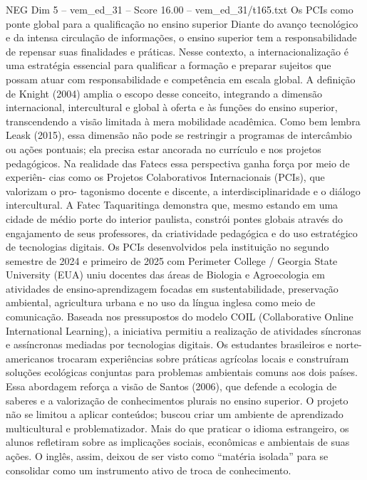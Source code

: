 \begin{textsample}{NEG Dim 5 – vem\_ed\_31 – Score 16.00 – vem\_ed\_31/t165.txt}  \label{ex:f5_neg_125}
Os PCIs como ponte global para a qualificação no ensino superior Diante do avanço tecnológico e da intensa circulação de informações, o ensino superior tem a responsabilidade de repensar suas finalidades e práticas.
Nesse contexto, a internacionalização é uma estratégia essencial para qualificar a formação e preparar sujeitos que possam atuar com responsabilidade e competência em escala global.
A definição de Knight (2004) amplia o escopo desse conceito, integrando a dimensão internacional, intercultural e global à oferta e às funções do ensino superior, transcendendo a visão limitada à mera mobilidade acadêmica.
Como bem lembra Leask (2015), essa dimensão não pode se restringir a programas de intercâmbio ou ações pontuais; ela precisa estar ancorada no currículo e nos projetos pedagógicos.
Na realidade das Fatecs essa perspectiva ganha força por meio de experiên- cias como os Projetos Colaborativos Internacionais (PCIs), que valorizam o pro- tagonismo docente e discente, a interdisciplinaridade e o diálogo intercultural.
A Fatec Taquaritinga demonstra que, mesmo estando em uma cidade de médio porte do interior paulista, constrói pontes globais através do engajamento de seus professores, da criatividade pedagógica e do uso estratégico de tecnologias digitais.
Os PCIs desenvolvidos pela instituição no segundo semestre de 2024 e primeiro de 2025 com Perimeter College / Georgia State University (EUA) uniu docentes das áreas de Biologia e Agroecologia em atividades de ensino-aprendizagem focadas em sustentabilidade, preservação ambiental, agricultura urbana e no uso da língua inglesa como meio de comunicação.
Baseada nos pressupostos do modelo COIL (Collaborative Online International Learning), a iniciativa permitiu a realização de atividades síncronas e assíncronas mediadas por tecnologias digitais.
Os estudantes brasileiros e norte-americanos trocaram experiências sobre práticas agrícolas locais e construíram soluções ecológicas conjuntas para problemas ambientais comuns aos dois países.
Essa abordagem reforça a visão de Santos (2006), que defende a ecologia de saberes e a valorização de conhecimentos plurais no ensino superior.
O projeto não se limitou a aplicar conteúdos; buscou criar um ambiente de aprendizado multicultural e problematizador.
Mais do que praticar o idioma estrangeiro, os alunos refletiram sobre as implicações sociais, econômicas e ambientais de suas ações.
O inglês, assim, deixou de ser visto como “matéria isolada” para se consolidar como um instrumento ativo de troca de conhecimento.

\end{textsample}
